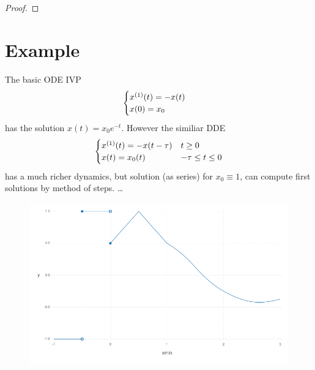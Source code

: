 \begin{proof}

\end{proof}


\section{Example}\label{example}
The basic ODE IVP
\begin{equation}
    \begin{cases}
        \D{x}(t) = -x(t)\\
        x(0) = x_0
    \end{cases}
\end{equation}
has the solution $x(t)=x_0 e^{-t}$. However the similiar DDE
\begin{equation}
    \begin{cases}
        \D{x}(t) = -x(t-\tau) & t\geq 0\\
        x(t) = x_0(t) & -\tau\leq t\leq 0
    \end{cases}
\end{equation}
has a much richer dynamics, but solution (as series) for $x_0\equiv 1$, can compute first solutions by method of steps. \ldots{}

\begin{figure}[h]\centering
    \includegraphics[width=\textwidth]{figures/piecewise-initial-function.png}
	\label{fig:not-allowed}
\end{figure}

